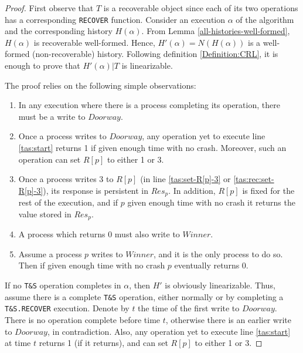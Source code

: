 \begin{proof}

First observe that $T$ is a recoverable object since each of its two operations has a corresponding \texttt{RECOVER} function. Consider an execution $\alpha$ of the algorithm and the corresponding history $H(\alpha)$. From Lemma \ref{all-histories-well-formed}, $H(\alpha)$ is recoverable well-formed. Hence, $H'(\alpha)=N(H(\alpha))$ is a well-formed (non-recoverable) history. Following definition \ref{Definition:CRL}, it is enough to prove that $H'(\alpha) | T$ is  linearizable.

	The proof relies on the following simple observations:
	\begin{enumerate} [noitemsep,topsep=0pt]
		\item In any execution where there is a process completing its operation, there must be a write to $Doorway$.
		\item Once a process writes to $Doorway$, any operation yet to execute line \ref{tas:start} returns 1 if given enough time with no crash. Moreover, such an operation can set $R[p]$ to either 1 or 3.
		\item Once a process writes 3 to $R[p]$ (in line \ref{tas:set-R[p]-3} or \ref{tas:rec:set-R[p]-3}), its response is persistent in $Res_p$. In addition, $R[p]$ is fixed for the rest of the execution, and if $p$ given enough time with no crash it returns the value stored in $Res_p$.
		\item A process which returns 0 must also write to $Winner$.
		\item Assume a process $p$ writes to $Winner$, and it is the only process to do so. Then if given enough time with no crash $p$ eventually returns 0.
	\end{enumerate}
	
	
	
	If no \texttt{T\&S} operation completes in $\alpha$, then $H'$ is obviously linearizable. Thus, assume there is a complete \texttt{T\&S} operation, either normally or by completing a \texttt{T\&S.RECOVER} execution. Denote by $t$ the time of the first write to $Doorway$. There is no operation complete before time $t$, otherwise there is an earlier write to $Doorway$, in contradiction. Also, any operation yet to execute line \ref{tas:start} at time $t$ returns 1 (if it returns), and can set $R[p]$ to either 1 or 3.


\end{proof}
